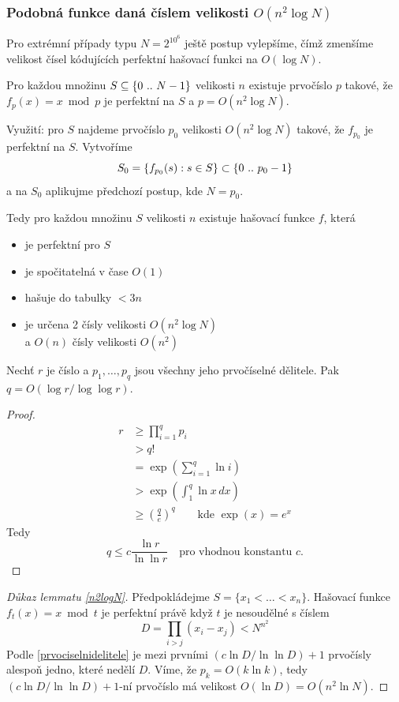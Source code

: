 \subsubsection{Podobná funkce daná číslem velikosti $O(n^2\log N)$}
Pro extrémní případy typu $N = 2^{10^6}$ ještě postup vylepšíme,
čímž zmenšíme velikost čísel kódujících perfektní hašovací funkci 
na $O(\log N)$.

\begin{lemma}
\label{n2logN}
Pro každou množinu $S \subseteq \{{0}\ ..\ {N-1}\}$ velikosti $n$ existuje
prvočíslo $p$ takové, že $f_{p}(x) = x \bmod p$ je perfektní na
$S$ a $p = O(n^2 \log N)$.
\end{lemma}

Využití: pro $S$ najdeme prvočíslo $p_0$ velikosti $O(n^2 \log N)$
takové, že $f_{p_0}$ je perfektní na $S$. Vytvoříme 
\[
S_0 = \{ f_{p_0}(s) : s \in S\} \subset \{{0}\ ..\ {p_0-1}\}
\]
a na $S_0$ aplikujme předchozí postup, kde $N = p_0$.

Tedy pro každou množinu $S$ velikosti $n$ existuje hašovací funkce $f$, která
\begin{itemize}
\item je perfektní pro $S$
\item je spočitatelná v čase $O(1)$ 
\item hašuje do tabulky $<3n$ 
\item je určena 2 čísly velikosti $O(n^2 \log N)$ \\
 \quad a $O(n)$ čísly velikosti $O(n^2)$ 
\end{itemize}

\begin{lemma}
\label{prvociselnidelitele}
Nechť $r$ je číslo a $p_1, \ldots, p_q$ jsou všechny jeho prvočíselné
dělitele. Pak $q=O(\log r / \log\log r)$.
\end{lemma}
\begin{proof}
\begin{align*}
r & \geq \prod_{i=1}^q p_i\\
 & > q! \\
 & = \exp(\sum_{i=1}^q \ln i) \\
 & > \exp(\int_1^q \ln x \,dx) \\
 & \geq {\left( \frac qe \right)}^q \qquad\text{kde } \exp(x)=e^x
\end{align*}
Tedy
\[
q \leq c \frac{\ln r}{\ln\ln r} \quad\text{pro vhodnou konstantu $c$.}
\]
\end{proof}
\begin{proof}[Důkaz lemmatu \ref{n2logN}]
Předpokládejme $S = \{ x_1 < \ldots < x_n \}$.
Hašovací funkce $f_t(x) = x \bmod t$ je perfektní právě když $t$ je
nesoudělné s číslem
\[
D = \prod_{i>j} (x_i - x_j) < N^{n^2}
\]
Podle \ref{prvociselnidelitele} je mezi prvními $(c \ln D / \ln\ln D)+1$
prvočísly alespoň jedno, které nedělí $D$. Víme, že $p_k = O(k \ln
k)$, tedy 
$(c \ln D / \ln\ln D) +1$-ní prvočíslo má velikost
$O(\ln D) = O( n^2 \ln N)$.
\end{proof}

